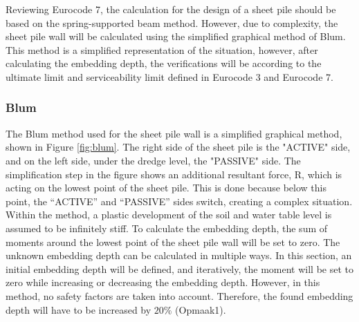 Reviewing Eurocode 7, the calculation for the design of a sheet pile should be based on the spring-supported beam method. However, due to complexity, the sheet pile wall will be calculated using the simplified graphical method of Blum. This method is a simplified representation of the situation, however, after calculating the embedding depth, the verifications will be according to the ultimate limit and serviceability limit defined in Eurocode 3 and Eurocode 7.

\subsubsection{Blum}

The Blum method used for the sheet pile wall is a simplified graphical method, shown in Figure \ref{fig:blum}. The right side of the sheet pile is the "ACTIVE" side, and on the left side, under the dredge level, the "PASSIVE" side. The simplification step in the figure shows an additional resultant force, R, which is acting on the lowest point of the sheet pile. This is done because below this point, the “ACTIVE” and “PASSIVE” sides switch, creating a complex situation. Within the method, a plastic development of the soil and water table level is assumed to be infinitely stiff. To calculate the embedding depth, the sum of moments around the lowest point of the sheet pile wall will be set to zero. The unknown embedding depth can be calculated in multiple ways. In this section, an initial embedding depth will be defined, and iteratively, the moment will be set to zero while increasing or decreasing the embedding depth. However, in this method, no safety factors are taken into account. Therefore, the found embedding depth will have to be increased by $20\%$ (Opmaak1).


